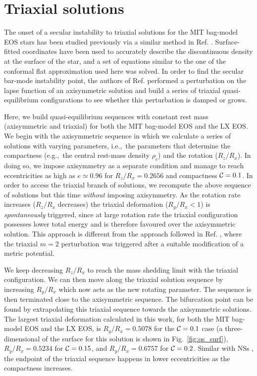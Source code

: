 \documentclass[twocolumn,superscriptaddress,showpacs,prd,aps,amsmath,amssymb,nofootinbib]{revtex4-1}
\newcommand{\ie}{i.e.,~}
\newcommand{\eg}{e.g.,~}
\begin{document}
\section{Triaxial solutions}
\label{sec:triasolution}

The onset of a secular instability to triaxial solutions for the MIT
bag-model EOS stars has been studied previously via a similar method in
Ref. \cite{rosinska2003}. Surface-fitted coordinates have been used to
accurately describe the discontinuous density at the surface of the star,
and a set of equations similar to the one of the conformal flat
approximation used here was solved. In order to find the secular bar-mode
instability point, the authors of Ref. \cite{rosinska2003} performed a
perturbation on the lapse function of an axisymmetric solution and build
a series of triaxial quasi-equilibrium configurations to see whether this
perturbation is damped or grows.


Here, we build quasi-equilibrium sequences with constant rest
mass (axisymmetric and triaxial) for both the MIT bag-model EOS and the LX
EOS. We begin with the axisymmetric sequence in which we calculate a series of
solutions with varying parameters, \ie the parameters that determine the
compactness (\eg the central rest-mass density $\rho_c$) and the rotation
($R_z/R_x$). In doing so, we impose axisymmetry as a separate condition
and manage to reach eccentricities as high as $e\simeq 0.96$ for
$R_z/R_x=0.2656$ and compactness $\mathcal{C}=0.1$.  In order to access the
triaxial branch of solutions, we recompute the above sequence of
solutions but this time \textit{without} imposing axisymmetry. As the
rotation rate increases ($R_z/R_x$ decreases) the triaxial deformation
($R_y/R_x <1$) is \textit{spontaneously} triggered, since at large
rotation rate the triaxial configuration possesses lower total energy and
is therefore favoured over the axisymmetric solution. This approach is
different from the approach followed in Ref. \cite{rosinska2002}, where
the triaxial $m=2$ perturbation was triggered after a suitable
modification of a metric potential.

We keep decreasing $R_z/R_x$ to reach the mass shedding limit with the
triaxial configuration. We can then move along the triaxial solution
sequence by increasing $R_y/R_x$ which now acts as the new rotating
parameter. The sequence is then terminated close to the axisymmetric
sequence. The bifurcation point can be found by extrapolating this
triaxial sequence towards the axisymmetric solutions. The largest
triaxial deformation calculated in this work, for both the MIT bag-model
EOS and the LX EOS, is $R_y/R_x=0.5078$ for the $\mathcal{C}=0.1$ case (a
three-dimensional of the surface for this solution is shown in
Fig.~\ref{fig:qs_surf}), $R_y/R_x=0.5234$ for $\mathcal{C}=0.15$, and
$R_y/R_x=0.6757$ for $\mathcal{C}=0.2$. Similar with NSs \cite{Huang2007}, the
endpoint of the triaxial sequence happens in lower eccentricities as the
compactness increases.
\end{document}
